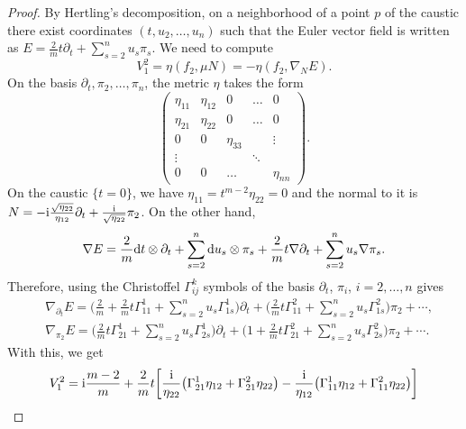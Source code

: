 \documentclass[pdftex]{sigma}
\numberwithin{equation}{section}
\begin{document}
\begin{proof}
 By Hertling's decomposition, on a neighborhood of a point $p$ of the caustic there exist coordinates $(t,u_{2},\dots,u_{n})$ such that the Euler vector field is written as $E=\tfrac{2}{m}t\partial_{t}+\sum_{s=2}^{n}u_{s}\pi_{s}$.
 We need to compute
 \begin{equation*}
 V_{1}^{2}=\eta(f_{2},\mu N)=-\eta(f_{2},\nabla_{N}E).
 \end{equation*}
 On the basis $\partial_{t},\pi_{2},\dots,\pi_{n}$, the metric $\eta$ takes the form
\begin{equation*}
 \begin{pmatrix}
 \eta_{11}&\eta_{12}&0&\dots&0\\
 \eta_{21}&\eta_{22}&0&\dots&0\\
 0&0&\eta_{33}&\,&\vdots\\
 \vdots& \,&\,&\ddots&\,\\
 0&0&\dots&\,&\eta_{nn}
 \end{pmatrix}.
\end{equation*}
On the caustic $\{ t=0 \}$, we have $\eta_{11}=t^{m-2}\eta_{22}=0$ and the normal to it is $N=-{\rm i}\frac{\sqrt{\eta_{22}}}{\eta_{12}}\partial_{t}+\frac{{\rm i}}{
\sqrt{\eta_{22}}}\pi_{2}$. On the other hand,
\begin{equation*}
 \nabla E=\frac{2}{m}{\rm d}t\otimes\partial_{t}+\sum_{s=2}^{n}{\rm d} u_{s}\otimes\pi_{s} +\frac{2}{m}t\nabla\partial_{t}+\sum_{s=2}^{n}u_{s}\nabla\pi_{s}.
\end{equation*}
Therefore, using the Christoffel $\Gamma_{ij}^{k}$ symbols of the basis $\partial_{t}$, $\pi_{i}$, $i=2,\dots,n$ gives
\begin{align*}
 &\nabla_{\partial_{t}}E=\Biggl( \frac{2}{m}+\frac{2}{m}t\Gamma_{11}^{1}+\sum_{s=2}^{n}u_{s}\Gamma_{1s}^{1}\Biggr)\partial_{t}+\Biggl( \frac{2}{m}t\Gamma_{11}^{2}+\sum_{s=2}^{n}u_{s}\Gamma_{1s}^{2}\Biggr)\pi_{2}+\cdots,\\
 &\nabla_{\pi_{2}}E=\Biggl(\frac{2}{m}t\Gamma_{21}^{1}+\sum_{s=2}^{n}u_{s}\Gamma_{2s}^{1}\Biggr)\partial_{t}+\Biggl( 1+\frac{2}{m}t\Gamma_{21}^{2}+\sum_{s=2}^{n}u_{s}\Gamma_{2s}^{2}\Biggr)\pi_{2}+\cdots.
\end{align*}
With this, we get
\begin{gather*}
 V^{2}_{1}= {\rm i}\frac{m-2}{m}+\frac{2}{m}t\bigg[ \frac{{\rm i}}{\eta_{22}}\bigl(\Gamma_{21}^{1}\eta_{12}+\Gamma_{21}^{2}\eta_{22} \bigr)-\frac{{\rm i}}{\eta_{12}}\bigl(\Gamma_{11}^{1}\eta_{12}+\Gamma_{11}^{2}\eta_{22} \bigr)\bigg] \\

\end{gather*}
\end{proof}
\end{document}
